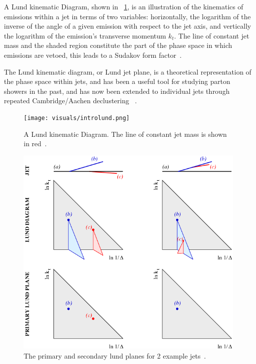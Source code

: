 A Lund kinematic Diagram, shown in  ~\ref{fig:introlund}, is an illustration of the kinematics of emissions within a jet in terms of two variables: horizontally, the logarithm of the inverse of the angle of a given emission with respect to the jet axis, and vertically the logarithm of the emission's transverse momentum $k_t$. The line of constant jet mass and the shaded region constitute the part of the phase space in which emissions are vetoed, this leads to a Sudakov form factor~\cite{mmdt}.

The Lund kinematic diagram, or Lund jet plane, is a theoretical representation of the phase space within jets, and has been a useful tool for studying parton showers in the past, and has now been extended to individual jets through repeated Cambridge/Aachen declustering ~\cite{Dreyer:2018nbf}.



\begin{figure}[htb]
\centering
\texttt{[image: visuals/introlund.png]}
\caption{A Lund kinematic Diagram. The line of constant jet mass is shown in red~\cite{mmdt}.  }
\label{fig:introlund}
\end{figure}



\begin{figure}[htb]
\centering
\includegraphics[width=1.0\textwidth]{visuals/figs_lund.png}
\caption{The primary and secondary lund planes for 2 example jets~\cite{Dreyer:2018nbf}.}
\label{fig:lundPrimaryandSecondary}
\end{figure}



